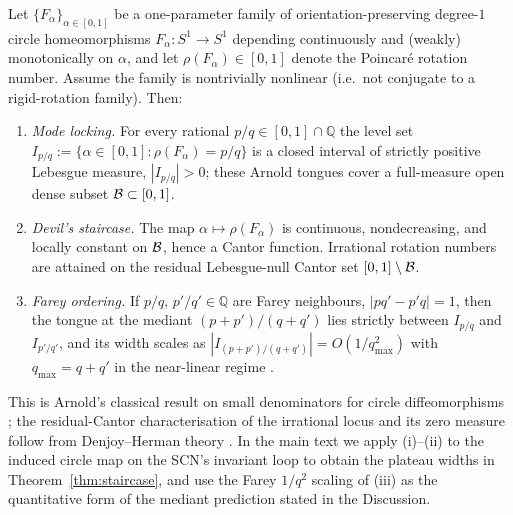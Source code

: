 \begin{theorem}\label{thm:supp:arnold-tongue}
Let $\{F_\alpha\}_{\alpha\in[0,1]}$ be a one-parameter family of orientation-preserving degree-$1$ circle homeomorphisms $F_\alpha:S^1\to S^1$ depending continuously and (weakly) monotonically on $\alpha$, and let $\rho(F_\alpha)\in[0,1]$ denote the Poincar\'e rotation number. Assume the family is nontrivially nonlinear (i.e.\ not conjugate to a rigid-rotation family). Then:
\begin{enumerate}
\item[(i)] \emph{Mode locking.} For every rational $p/q\in[0,1]\cap\mathbb{Q}$ the level set $I_{p/q}:=\{\alpha\in[0,1]:\rho(F_\alpha)=p/q\}$ is a closed interval of strictly positive Lebesgue measure, $|I_{p/q}|>0$; these Arnold tongues cover a full-measure open dense subset $\mathcal{B}\subset[0,1]$.
\item[(ii)] \emph{Devil's staircase.} The map $\alpha\mapsto\rho(F_\alpha)$ is continuous, nondecreasing, and locally constant on $\mathcal{B}$, hence a Cantor function. Irrational rotation numbers are attained on the residual Lebesgue-null Cantor set $[0,1]\setminus\mathcal{B}$.
\item[(iii)] \emph{Farey ordering.} If $p/q,\,p'/q'\in\mathbb{Q}$ are Farey neighbours, $|pq'-p'q|=1$, then the tongue at the mediant $(p+p')/(q+q')$ lies strictly between $I_{p/q}$ and $I_{p'/q'}$, and its width scales as $|I_{(p+p')/(q+q')}|=O(1/q_{\max}^{2})$ with $q_{\max}=q+q'$ in the near-linear regime \citep{arnold1961small}.
\end{enumerate}
\end{theorem}

\noindent This is Arnold's classical result on small denominators for circle diffeomorphisms \citep{arnold1961small}; the residual-Cantor characterisation of the irrational locus and its zero measure follow from Denjoy--Herman theory \citep{herman1979conjugaison}. In the main text we apply (i)--(ii) to the induced circle map on the SCN's invariant loop to obtain the plateau widths in Theorem~\ref{thm:staircase}, and use the Farey $1/q^{2}$ scaling of (iii) as the quantitative form of the mediant prediction stated in the Discussion.

